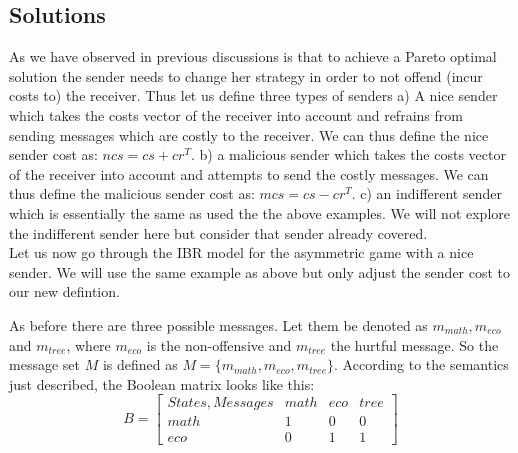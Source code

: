 \documentclass{article}
\begin{document}
\subsection{Solutions}
As we have observed in previous discussions is that to achieve a Pareto optimal solution the sender needs to change her strategy in order to not offend (incur costs to) the receiver. Thus let us define three types of senders a) A nice sender which takes the costs vector of the receiver into account and refrains from sending messages which are costly to the receiver. We can thus define the nice sender cost as: $ncs=cs + cr^T$. b) a malicious sender which takes the costs vector of the receiver into account and attempts to send the costly messages. We can thus define the malicious sender cost as: $mcs=cs - cr^T$. c) an indifferent sender which is essentially the same as used the the above examples. We will not explore the indifferent sender here but consider that sender already covered. \\
Let us now go through the IBR model for the asymmetric game with a nice sender. We will use the same example as above but only adjust the sender cost to our new defintion.

As before there are three possible messages. Let them be denoted as $m_{math},m_{eco}$ and $m_{tree}$, where $m_{eco}$ is the non-offensive and $m_{tree}$ the hurtful message. So the message set $M$ is defined as $M=\{m_{math},m_{eco},m_{tree}\}$. According to the semantics just described, the Boolean matrix looks like this:\\
\begin{equation*}
B =
\begin{bmatrix}

States, Messages & math & eco & tree \\
math             & 1    & 0   & 0    \\
eco              & 0    & 1   & 1
\end{bmatrix}
\end{equation*}
\end{document}
